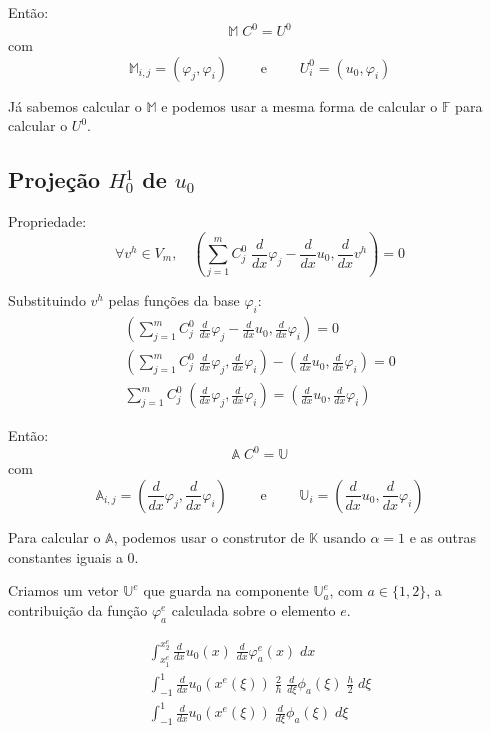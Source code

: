 \documentclass[a4paper]{article}
\newcommand{\vphi}{\varphi}
\begin{document}
Então:
\[
  \mathbb{M} \; C^0 = U^0
\]
com
\[
    \mathbb{M}_{i,j} = (\varphi_j, \varphi_i)
    \qquad\text{ e }\qquad
    U^0_i = (u_0, \varphi_i)
\]

Já sabemos calcular o \(\mathbb{M}\)
e podemos usar a mesma forma de calcular o \(\mathbb{F}\)
para calcular o \(U^0\).

\subsection{Projeção \texorpdfstring{\(H^1_0\)}{H10} de \texorpdfstring{\(u_0\)}{u0}}

Propriedade:
\[
    \forall v^h \in V_m, \quad
    (\sum_{j=1}^m{ C^0_j \; \frac{d}{dx}\vphi_j } - \frac{d}{dx}u_0, \frac{d}{dx}v^h) = 0
\]

Substituindo \(v^h\) pelas funções da base \(\vphi_i\):
\[ \begin{array}{l} \displaystyle
    (\sum_{j=1}^m{ C^0_j \; \frac{d}{dx}\vphi_j } - \frac{d}{dx}u_0, \frac{d}{dx}\vphi_i) = 0
    \\ \displaystyle
    (\sum_{j=1}^m{ C^0_j \; \frac{d}{dx}\vphi_j }, \frac{d}{dx}\vphi_i) - (\frac{d}{dx}u_0, \frac{d}{dx}\vphi_i) = 0
    \\ \displaystyle
    \sum_{j=1}^m{ C^0_j \; (\frac{d}{dx}\vphi_j, \frac{d}{dx}\vphi_i) } = (\frac{d}{dx}u_0, \frac{d}{dx}\vphi_i)
\end{array} \]

Então:
\[
  \mathbb{A} \; C^0 = \mathbb{U}
\]
com
\[
    \mathbb{A}_{i,j} = (\frac{d}{dx}\varphi_j, \frac{d}{dx}\varphi_i)
    \qquad\text{ e }\qquad
    \mathbb{U}_i = (\frac{d}{dx}u_0, \frac{d}{dx}\varphi_i)
\]

Para calcular o \(\mathbb{A}\),
podemos usar o construtor de \(\mathbb{K}\)
usando \(\alpha = 1\) e as outras constantes iguais a \(0\).

Criamos um vetor \(\mathbb{U}^{e}\)
que guarda na componente \(\mathbb{U}^e_a\),
com \(a \in \{ 1, 2 \}\),
a contribuição da função \(\vphi^e_a\)
calculada sobre o elemento \(e\).

\[ \begin{array}{l} \displaystyle
    \int_{x^e_1}^{x^e_2}{
        \frac{d}{dx}u_0(x) \; \frac{d}{dx}\varphi^e_a(x)
    \;dx}
    \\[2ex] \displaystyle
    \int_{-1}^1{
        \frac{d}{dx}u_0(x^e(\xi)) \; \frac{2}{h} \; \frac{d}{d\xi}\phi_a(\xi)
        \; \frac{h}{2}
    \;d\xi}
    \\[2ex] \displaystyle
    \int_{-1}^1{
        \frac{d}{dx}u_0(x^e(\xi)) \; \frac{d}{d\xi}\phi_a(\xi)
    \;d\xi}
\end{array} \]
\end{document}
